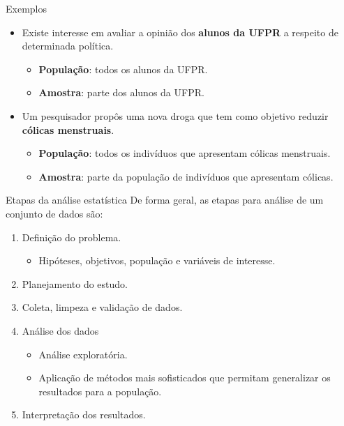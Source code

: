 \documentclass[
  ignorenonframetext,
  serif,
  professionalfont,
  usenames,
  dvipsnames,
  aspectratio = 169]{beamer}
\providecommand{\tightlist}{%
  \setlength{\itemsep}{0pt}\setlength{\parskip}{0pt}}
\renewcommand{\tightlist}{%
  \setlength{\itemsep}{0\baselineskip}
  \setlength{\parskip}{0.25\baselineskip}
}
\begin{document}
\begin{frame}{Exemplos}
\label{exemplos}
\begin{itemize}
\tightlist
\item
  Existe interesse em avaliar a opinião dos \textbf{alunos da UFPR} a
  respeito de determinada política.

  \begin{itemize}
  \tightlist
  \item
    \textbf{População}: todos os alunos da UFPR.
  \item
    \textbf{Amostra}: parte dos alunos da UFPR.
  \end{itemize}
\end{itemize}

\vspace{0.5cm}

\begin{itemize}
\tightlist
\item
  Um pesquisador propôs uma nova droga que tem como objetivo reduzir
  \textbf{cólicas menstruais}.

  \begin{itemize}
  \tightlist
  \item
    \textbf{População}: todos os indivíduos que apresentam cólicas
    menstruais.
  \item
    \textbf{Amostra}: parte da população de indivíduos que apresentam
    cólicas.
  \end{itemize}
\end{itemize}
\end{frame}

\begin{frame}{Etapas da análise estatística}
\label{etapas-da-anuxe1lise-estatuxedstica}
De forma geral, as etapas para análise de um conjunto de dados são:

\begin{enumerate}
\tightlist
\item
  Definição do problema.

  \begin{itemize}
  \tightlist
  \item
    Hipóteses, objetivos, população e variáveis de interesse.
  \end{itemize}
\item
  Planejamento do estudo.
\item
  Coleta, limpeza e validação de dados.
\item
  Análise dos dados

  \begin{itemize}
  \tightlist
  \item
    Análise exploratória.
  \item
    Aplicação de métodos mais sofisticados que permitam generalizar os
    resultados para a população.
  \end{itemize}
\item
  Interpretação dos resultados.
\end{enumerate}
\end{frame}
\end{document}
